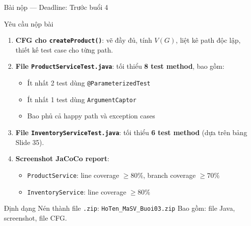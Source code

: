 \documentclass[aspectratio=169,12pt]{beamer}
\begin{document}
\begin{frame}[shrink=16]{Bài nộp --- Deadline: Trước buổi 4}
  \begin{block}{Yêu cầu nộp bài}
    \begin{enumerate}
      \item \textbf{CFG cho \texttt{createProduct()}}:
        vẽ đầy đủ, tính $V(G)$, liệt kê path độc lập,
        thiết kế test case cho từng path.

      \item \textbf{File \texttt{ProductServiceTest.java}}:
        tối thiểu \textbf{8 test method}, bao gồm:
        \begin{itemize}
          \item Ít nhất 2 test dùng \texttt{@ParameterizedTest}
          \item Ít nhất 1 test dùng \texttt{ArgumentCaptor}
          \item Bao phủ cả happy path và exception cases
        \end{itemize}

      \item \textbf{File \texttt{InventoryServiceTest.java}}:
        tối thiểu \textbf{6 test method} (dựa trên bảng Slide 35).

      \item \textbf{Screenshot JaCoCo report}:
        \begin{itemize}
          \item \texttt{ProductService}: line coverage $\geq 80\%$, branch coverage $\geq 70\%$
          \item \texttt{InventoryService}: line coverage $\geq 80\%$
        \end{itemize}
    \end{enumerate}
  \end{block}

  \begin{alertblock}{Định dạng}
    Nén thành file \texttt{.zip}: \texttt{HoTen\_MaSV\_Buoi03.zip}
    Bao gồm: file Java, screenshot, file CFG.
  \end{alertblock}
\end{frame}
\end{document}
